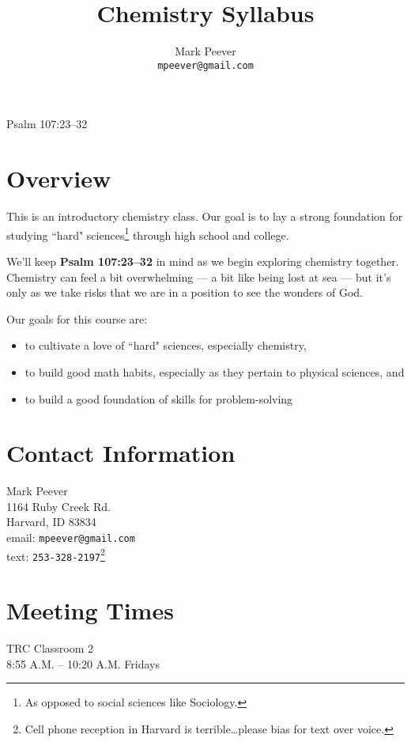 \documentclass[11pt, oneside]{article}   	%
\title{Chemistry Syllabus}
\author{Mark Peever\\ \texttt{mpeever@gmail.com}}
\begin{document}
\maketitle

\begin{center}
Psalm 107:23--32
\end{center}

\section{Overview}
This is an introductory chemistry class. Our goal is to lay a strong foundation for studying ``hard" sciences\footnote{As opposed to social sciences like Sociology.} through high school and college. 

We'll keep \textbf{Psalm 107:23--32} in mind as we begin exploring chemistry together. Chemistry can feel a bit overwhelming --- a bit like being lost at sea --- but it's only as we take risks that we are in a position to see the wonders of God.

Our goals for this course are:
\begin{itemize}
\item to cultivate a love of ``hard" sciences, especially chemistry,
\item to build good math habits, especially as they pertain to physical sciences, and
\item to build a good foundation of skills for problem-solving
\end{itemize}

\section{Contact Information}
Mark Peever\\
1164 Ruby Creek Rd.\\
Harvard, ID 83834 \\
email: \texttt{mpeever@gmail.com} \\
text: \texttt{253-328-2197}\footnote{Cell phone reception in Harvard is terrible\ldots please bias for text over voice.} \\


\section{Meeting Times}
TRC Classroom 2       \\
8:55 A.M. -- 10:20 A.M. Fridays \\ 
\end{document}
